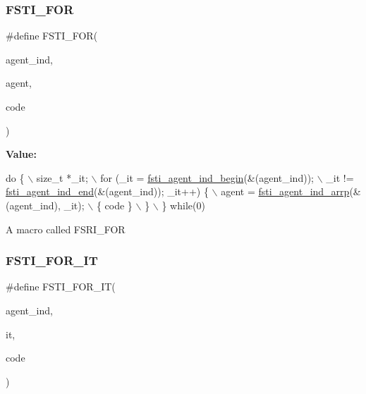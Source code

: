 \subsubsection{\texorpdfstring{F\+S\+T\+I\+\_\+\+F\+OR}{FSTI\_FOR}}
{\footnotesize\ttfamily \#define F\+S\+T\+I\+\_\+\+F\+OR(\begin{DoxyParamCaption}\item[{}]{agent\+\_\+ind,  }\item[{}]{agent,  }\item[{}]{code }\end{DoxyParamCaption})}

{\bfseries Value\+:}
\begin{DoxyCode}
\textcolor{keywordflow}{do} \{                           \(\backslash\)
        size\_t *\_it;                                                    \(\backslash\)
        for (\_it = \mbox{\hyperlink{fsti-agent_8h_af8ec082c043d0719f2933f78c9b74879}{fsti\_agent\_ind\_begin}}(&(agent\_ind));                  \(\backslash\)
             \_it != \mbox{\hyperlink{fsti-agent_8h_a0a007fca1a85b26dc9f890b5c9f5649a}{fsti\_agent\_ind\_end}}(&(agent\_ind)); \_it++) \{          \(\backslash\)
            agent = \mbox{\hyperlink{fsti-agent_8h_a0d3fcfadb1159b63508be133b30f8df7}{fsti\_agent\_ind\_arrp}}(&(agent\_ind), \_it);             \(\backslash\)
            \{ code \}                                                    \(\backslash\)
        \}                                                               \(\backslash\)
    \} \textcolor{keywordflow}{while}(0)
\end{DoxyCode}
A macro called F\+S\+R\+I\+\_\+\+F\+OR \mbox{\label{fsti-agent_8h_a9cdc0f2e5160a06cdbbbd9a0807513f5}} 
\subsubsection{\texorpdfstring{F\+S\+T\+I\+\_\+\+F\+O\+R\+\_\+\+IT}{FSTI\_FOR\_IT}}
{\footnotesize\ttfamily \#define F\+S\+T\+I\+\_\+\+F\+O\+R\+\_\+\+IT(\begin{DoxyParamCaption}\item[{}]{agent\+\_\+ind,  }\item[{}]{it,  }\item[{}]{code }\end{DoxyParamCaption})}

